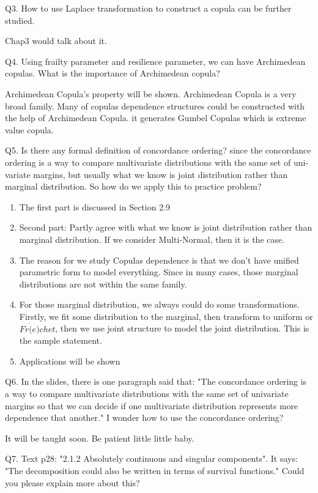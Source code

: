 \documentclass[a4paper,12pt]{texMemo}
\begin{document}
Q3. How to use Laplace transformation to construct a copula can be further studied. 

Chap3 would talk about it.

Q4. Using frailty parameter and resilience parameter, we can have Archimedean copulas. What is the importance of Archimedean copula?

Archimedean Copula's property will be shown. Archimedean Copula is a very broad family. Many of copulas dependence structures could be constructed with the help of Archimedean Copula. it generates Gumbel Copulas which is extreme value copula.

Q5. Is there any formal definition of concordance ordering? since the concordance ordering is a way to compare multivariate distributions with the same set of uni-variate margins, but usually what we know is joint distribution rather than marginal distribution. So how do we apply this to practice problem?

\begin{enumerate}
\item The first part is discussed in Section 2.9
\item Second part: Partly agree with what we know is joint distribution rather than marginal distribution. If we consider Multi-Normal, then it is the case. 
\item The reason for we study Copulas dependence is that we don't have unified parametric form to model everything. Since in many cases, those marginal distributions are not within the same family. 
\item For those marginal distribution, we always could do some transformations. Firstly, we fit some distribution to the marginal, then transform to uniform or $Fr\acute(e)chet$, then we use joint structure to model the joint distribution. This is the sample statement.
\item Applications will be shown
\end{enumerate}

Q6. In the slides, there is one paragraph said that: 
"The concordance ordering is a way to compare multivariate distributions with the same set of univariate margins so that we can decide if one multivariate distribution represents more dependence that another."
I wonder how to use the concordance ordering?

It will be taught soon. Be patient little little baby.

Q7. Text p28: "2.1.2 Absolutely continuous and singular components". It says: "The decomposition could also be written in terms of survival functions." Could you please explain more about this?
\end{document}
